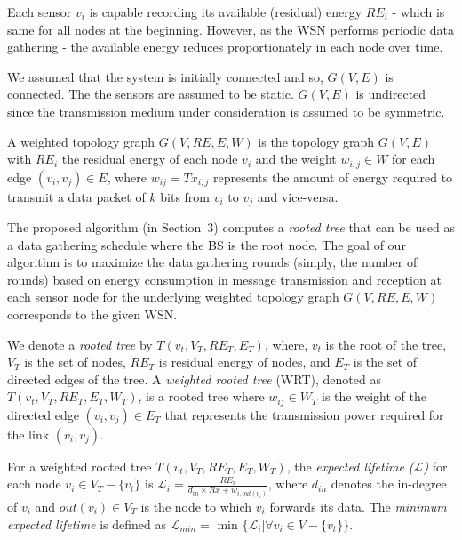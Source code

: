 \documentclass[10pt]{llncs}
\begin{document}
Each sensor $v_i$ is capable recording its available (residual) energy $RE_i$ - which is same for all nodes at the beginning. However, as the WSN performs periodic data gathering - the available energy reduces proportionately in each node over time. 

We assumed that the system is initially connected and so, $G(V,E)$ is connected. The the sensors are assumed to be static. $G(V,E)$ is undirected since the transmission medium under consideration is assumed to be symmetric.

\begin{definition}
A weighted topology graph $G(V, RE, E, W)$ is the topology graph $G(V, E)$ with $RE_i$ the residual energy of each node $v_i$ and the weight $w_{i,j} \in W$ for each edge $(v_i, v_j) \in E$, where $w_{ij} = Tx_{i,j}$ represents the amount of energy required to transmit a data packet of $k$ bits from $v_i$ to $v_j$ and vice-versa.
\end{definition}

The proposed algorithm (in Section~3) computes a {\it rooted tree} that can be used as a data gathering schedule where the BS is the root node. The goal of our algorithm is to maximize the data gathering rounds (simply, the number of rounds) based on energy consumption in message transmission and reception at each sensor node for the underlying weighted topology graph $G(V, RE, E, W)$ corresponds to the given WSN.

We denote a {\it rooted tree} by $T(v_t, V_T, RE_T, E_T)$, where, $v_t$ is the root of the tree, $V_T$ is the set of nodes, $RE_T$ is residual energy of nodes, and $E_T$ is the set of directed edges of the tree. A {\it weighted rooted tree} (WRT), denoted as $T(v_t, V_T, RE_T, E_T, W_T)$, is a rooted tree where $w_{ij} \in W_T$ is the weight of the directed edge $ {(v_i, v_j)} \in E_T$ that represents the transmission power required for the link $ {(v_i, v_j)}$.

\begin{definition}
For a weighted rooted tree $T(v_t, V_T, RE_T, E_T, W_T)$, the {\it expected lifetime ($\mathcal{L}$)} for each node $v_i \in V_T-\{v_t\}$ is $\mathcal{L}_i = \frac{RE_i}{d_{in} \times Rx + w_{i,out(v_i)}}$, where $d_{in}$ denotes the in-degree of $v_i$ and $out(v_i) \in V_T$ is the node to which $v_i$ forwards its data. The {\it minimum expected lifetime} is defined as $\mathcal{L}_{min} = \textrm{ min }\{\mathcal{L}_i | \forall v_i \in V-\{v_t\}\}$.
\end{definition}
\end{document}
